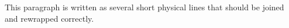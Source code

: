 This paragraph is written
as several short physical
lines that should be joined
and rewrapped correctly.
